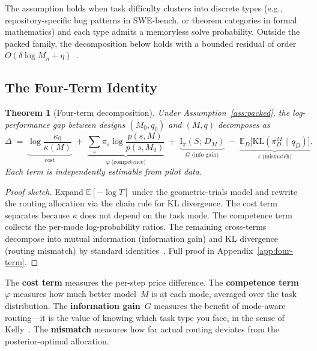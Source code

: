 \documentclass[11pt]{article}
\newtheorem{theorem}{Theorem}
\newtheorem{proof}{Proof}
\newcommand{\KL}{\mathrm{KL}}
\newcommand{\E}{\mathbb{E}}
\newcommand{\Mn}{M_n}
\newcommand{\MI}{\mathrm{I}}
\newcommand{\mismatch}{\varepsilon}
\begin{document}
The assumption holds when task difficulty clusters into discrete types
(e.g., repository-specific bug patterns in SWE-bench, or theorem
categories in formal mathematics) and each type admits a memoryless solve
probability.  Outside the packed family, the decomposition below holds with
a bounded residual of order
$O(\delta \log \Mn + \eta)$~\citep{beneventano2026framework}.

\subsection{The Four-Term Identity}
\label{sec:four-term}

\begin{theorem}[Four-term decomposition]
\label{thm:four-term}
Under Assumption~\ref{ass:packed}, the log-performance gap between designs
$(M_0, q_0)$ and $(M, q)$ decomposes as
\begin{equation}
\label{eq:four-term}
  \Delta \;=\;
  \underbrace{\log\frac{\kappa_0}{\kappa(M)}}_{\text{cost}}
  \;+\; \underbrace{\sum_s \pi_s \log\frac{p(s,M)}{p(s,M_0)}}_{\varphi\;\text{(competence)}}
  \;+\; \underbrace{\MI_\pi(S;\,D_M)}_{G\;\text{(info gain)}}
  \;-\; \underbrace{\E_D\!\bigl[\KL(\pi_D^M \| q_D)\bigr]}_{\mismatch\;\text{(mismatch)}}.
\end{equation}
Each term is independently estimable from pilot data.
\end{theorem}

\begin{proof}[Proof sketch]
Expand $\E[-\log T]$ under the geometric-trials model and rewrite the
routing allocation via the chain rule for KL divergence.  The cost term
separates because $\kappa$ does not depend on the task mode.  The
competence term collects the per-mode log-probability ratios.  The
remaining cross-terms decompose into mutual information (information
gain) and KL divergence (routing mismatch) by standard
identities~\citep{beneventano2026framework}.
Full proof in Appendix~\ref{app:four-term}.
\end{proof}

The \textbf{cost term} measures the per-step price difference.  The
\textbf{competence term}~$\varphi$ measures how much better model~$M$ is
at each mode, averaged over the task distribution.  The \textbf{information
gain}~$G$ measures the benefit of mode-aware routing---it is the value of
knowing which task type you face, in the sense of
Kelly~\citeyearpar{kelly1956new}.  The \textbf{mismatch} measures how far
actual routing deviates from the posterior-optimal allocation.
\end{document}
